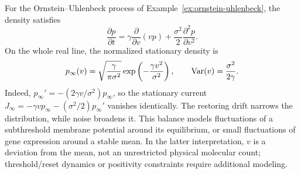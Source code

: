 \begin{example}
For the Ornstein--Uhlenbeck process of Example~\ref{ex:ornstein-uhlenbeck}, the density satisfies
\begin{equation}
\frac{\partial p}{\partial t}
=\gamma\frac{\partial}{\partial v}(vp)
+\frac{\sigma^2}{2}\frac{\partial^2p}{\partial v^2}.
\end{equation}
On the whole real line, the normalized stationary density is
\begin{equation}
p_\infty(v)=\sqrt{\frac{\gamma}{\pi\sigma^2}}
\exp\left(-\frac{\gamma v^2}{\sigma^2}\right),
\qquad \operatorname{Var}(v)=\frac{\sigma^2}{2\gamma}.
\end{equation}
Indeed, $p_\infty'=-(2\gamma v/\sigma^2)p_\infty$, so the stationary current $J_\infty=-\gamma v p_\infty-(\sigma^2/2)p_\infty'$ vanishes identically. The restoring drift narrows the distribution, while noise broadens it. This balance models fluctuations of a subthreshold membrane potential around its equilibrium, or small fluctuations of gene expression around a stable mean. In the latter interpretation, $v$ is a deviation from the mean, not an unrestricted physical molecular count; threshold/reset dynamics or positivity constraints require additional modeling.
\end{example}